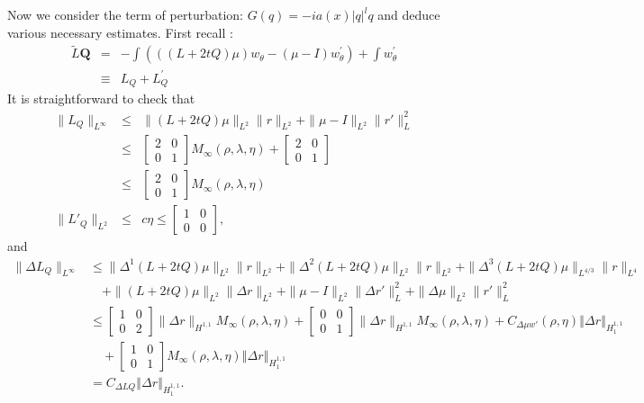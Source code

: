 \documentclass{amsart}
\theoremstyle{plain}
\theoremstyle{remark}
\numberwithin{equation}{section}
\newcommand{\norm}[2]{\left\Vert #1\right\Vert_{#2}}
\newcommand{\Twomat}[4]
{
\left[
	\begin{array}{cc}
		{#1}	&	{#2}	\\[10pt]
		{#3}	&	{#4}
		\end{array}
\right]
}
\begin{document}
Now we consider the term of perturbation:
$G\left( q\right) =-ia\left( x\right) \left\vert q\right\vert ^{l}q$
and deduce various necessary estimates. First recall \cite[P.228]{DZ-2}:
\begin{eqnarray*}
    \tilde{L} \mathbf{Q} & = &-\int\left(((L+2 t Q) \mu) w_\theta-(\mu-I) w_\theta^{\prime}\right)+\int w_\theta^{\prime} \\
    & \equiv & L_Q+L_Q^{\prime}
\end{eqnarray*}
It is straightforward to check that
\begin{eqnarray*}
    \|L_Q\|_{L^\infty} & \leq & \|\left( L+2tQ \right)\mu\|_{L^2}\|r\|_{L^2}+\|\mu-I\|_{L^2}\|r'\|_L^2 \\
    & \leq & \Twomat{2}{0}{0}{1}M_{\infty}(\rho,\lambda, \eta)+\Twomat{2}{0}{0}{1} \\
    &\leq& \Twomat{2}{0}{0}{1}M_{\infty}(\rho,\lambda, \eta)\\
    \|L'_Q\|_{L^2} & \leq & c\eta \leq \Twomat{1}{0}{0}{0},
\end{eqnarray*}
and
\begin{align*}
    \|\Delta L_Q\|_{L^\infty} & \leq  \| \Delta^1 \left(L+2tQ \right)\mu\|_{L^2}\|r\|_{L^2} + \| \Delta^2 \left(L+2tQ \right)\mu\|_{L^2}\|r\|_{L^2}+ \| \Delta^3 \left(L+2tQ \right)\mu\|_{L^{4/3}}\|r\|_{L^4}\\
    &\quad + \|\left(L+2tQ \right)\mu\|_{L^2}\|\Delta r\|_{L^2}+\|\mu-I\|_{L^2}\|\Delta r'\|_L^2+\|\Delta \mu\|_{L^2}\|r'\|_L^2 \\
     &  \leq  \Twomat{1}{0}{0}{2}\|\Delta r\|_{H^{1,1}} M_{\infty}(\rho,\lambda, \eta)+ \Twomat{0}{0}{0}{1}\|\Delta r\|_{H^{1,1}} M_{\infty}(\rho,\lambda, \eta) + C_{\Delta \mu w' }(\rho, \eta )\norm{\Delta r}{H^{1,1}_1}\\
     &\quad +  \Twomat{1}{0}{0}{1} M_{\infty}(\rho,\lambda, \eta)\norm{\Delta r}{H^{1,1}_1}\\
     &=C_{\Delta LQ} \norm{\Delta r}{H^{1,1}_1}.
\end{align*}
\end{document}
